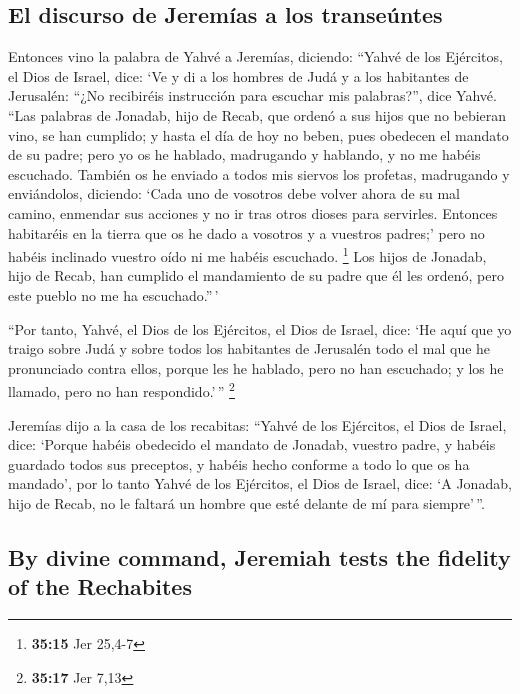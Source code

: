 \begin{paracol}{2}
\hypertarget{el-discurso-de-jeremuxedas-a-los-transeuxfantes}{%
\subsection{El discurso de Jeremías a los
transeúntes}\label{el-discurso-de-jeremuxedas-a-los-transeuxfantes}}

 Entonces vino la palabra de Yahvé a Jeremías, diciendo:
 ``Yahvé de los Ejércitos, el Dios de Israel, dice: `Ve y
di a los hombres de Judá y a los habitantes de Jerusalén: ``¿No
recibiréis instrucción para escuchar mis palabras?'', dice Yahvé.
 ``Las palabras de Jonadab, hijo de Recab, que ordenó a
sus hijos que no bebieran vino, se han cumplido; y hasta el día de hoy
no beben, pues obedecen el mandato de su padre; pero yo os he hablado,
madrugando y hablando, y no me habéis escuchado.  También
os he enviado a todos mis siervos los profetas, madrugando y
enviándolos, diciendo: `Cada uno de vosotros debe volver ahora de su mal
camino, enmendar sus acciones y no ir tras otros dioses para servirles.
Entonces habitaréis en la tierra que os he dado a vosotros y a vuestros
padres;' pero no habéis inclinado vuestro oído ni me habéis escuchado.
\footnote{\textbf{35:15} Jer 25,4-7}  Los hijos de
Jonadab, hijo de Recab, han cumplido el mandamiento de su padre que él
les ordenó, pero este pueblo no me ha escuchado.''\,'

 ``Por tanto, Yahvé, el Dios de los Ejércitos, el Dios de
Israel, dice: `He aquí que yo traigo sobre Judá y sobre todos los
habitantes de Jerusalén todo el mal que he pronunciado contra ellos,
porque les he hablado, pero no han escuchado; y los he llamado, pero no
han respondido.'\,'' \footnote{\textbf{35:17} Jer 7,13}

 Jeremías dijo a la casa de los recabitas: ``Yahvé de los
Ejércitos, el Dios de Israel, dice: `Porque habéis obedecido el mandato
de Jonadab, vuestro padre, y habéis guardado todos sus preceptos, y
habéis hecho conforme a todo lo que os ha mandado',  por
lo tanto Yahvé de los Ejércitos, el Dios de Israel, dice: `A Jonadab,
hijo de Recab, no le faltará un hombre que esté delante de mí para
siempre'\,''.

\switchcolumn
\begin{otherlanguage}{english}

\hypertarget{by-divine-command-jeremiah-tests-the-fidelity-of-the-rechabites}{%
\subsection{By divine command, Jeremiah tests the fidelity of the
Rechabites}\label{by-divine-command-jeremiah-tests-the-fidelity-of-the-rechabites}}


\end{otherlanguage}
\end{paracol}

